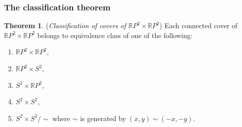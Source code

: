 \documentclass[letterpaper,11pt,twoside]{article}
\theoremstyle{definition}
\theoremstyle{definition}
\newtheorem{theorem}[proposition]{Theorem}
\theoremstyle{definition}
\theoremstyle{definition}
\theoremstyle{definition}
\theoremstyle{definition}
\theoremstyle{remark}
\theoremstyle{definition}
\newcommand{\R}[0]{\mathbb{R}}
\newcommand{\RP}[0]{\R P}
\begin{document}
\subsubsection{The classification theorem}
\begin{theorem}\label{T-6.2.1}
	(\textit{Classification of covers of $ \RP^{2}\times \RP^{2} $}) Each connected cover of $ \RP^{2}\times \RP^{2} $ belongs to equivalence class of one of the following:
	\begin{enumerate}
		\item {$ \RP^{2}\times \RP^{2} $,}
		\item {$ \RP^{2}\times S^{2} $,}
		\item {$ S^{2}\times \RP^{2} $,}
		\item {$ S^{2} \times S^{2}$,}
		\item {$ S^{2}\times S^{2}/\sim$ where $ \sim $ is generated by $ (x,y) \sim (-x,-y) $.}
	\end{enumerate}
\end{theorem}
\end{document}

